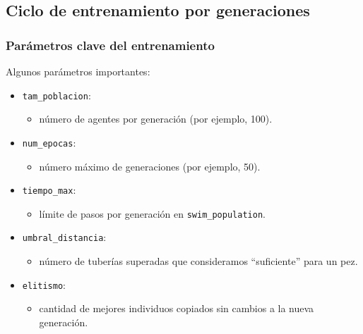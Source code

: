 \documentclass[
	11pt, %
]{beamer}
\begin{document}

\subsection{Ciclo de entrenamiento por generaciones}


\begin{frame}
\frametitle{Parámetros clave del entrenamiento}

Algunos parámetros importantes:

\begin{itemize}
    \item \texttt{tam\_poblacion}:
    \begin{itemize}
        \item número de agentes por generación (por ejemplo, 100).
    \end{itemize}

    \item \texttt{num\_epocas}:
    \begin{itemize}
        \item número máximo de generaciones (por ejemplo, 50).
    \end{itemize}

    \item \texttt{tiempo\_max}:
    \begin{itemize}
        \item límite de pasos por generación en \texttt{swim\_population}.
    \end{itemize}

    \item \texttt{umbral\_distancia}:
    \begin{itemize}
        \item número de tuberías superadas que consideramos ``suficiente'' para un pez.
    \end{itemize}

    \item \texttt{elitismo}:
    \begin{itemize}
        \item cantidad de mejores individuos copiados sin cambios a la nueva generación.
    \end{itemize}
\end{itemize}

\end{frame}


\end{document}
